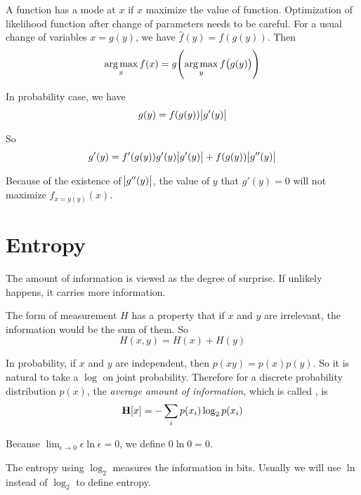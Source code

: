 \begin{theorem}
    A function has a mode at $x$ if $x$ maximize the value of function. Optimization of likelihood function after change of parameters needs to be careful. For a usual change of variables $x = g(y)$, we have $\hat{f}(y) = f(g(y))$. Then
    \begin{equation}
         \argmax{x}f(x) = g\mleft(\argmax{y}f\mleft(g(y)\mright)\mright)
    \end{equation}
    
    In probability case, we have
    \begin{equation}
        g(y) = f(g(y)) \abs{g'(y)}
    \end{equation}
    
    So
    \begin{equation}
        g'(y) = f'(g(y)) g'(y) \abs{g'(y)} + f(g(y)) \abs{g''(y)}
    \end{equation}
    
    Because of the existence of $\abs{g''(y)}$, the value of $y$ that $g'(y) = 0$ will not maximize $f_{x = g(y)}(x)$.
\end{theorem}


\section{Entropy}

\begin{definition}
    The amount of information is viewed as the degree of surprise. If unlikely happens, it carries more information. 
    
    The form of measurement $H$ has a property that if $x$ and $y$ are irrelevant, the information would be the sum of them. So
    \begin{equation}
        H(x,y) = H(x) + H(y)
    \end{equation}
    
    In probability, if $x$ and $y$ are independent, then $p(xy)= p(x) p(y)$. So it is natural to take a $\log$ on joint probability. Therefore for a discrete probability distribution $p(x)$, the \emph{average amount of information}, which is called , is
    \begin{equation}
        \entropy{x} = - \sum_i p(x_i) \log_2 p(x_i)
    \end{equation}
    
    Because $\displaystyle \lim_{\epsilon \rightarrow 0} \epsilon \ln \epsilon = 0$, we define $0 \ln 0 = 0$.
    
    The entropy using $\log_2$ measures the information in bits. Usually we will use $\ln$ instead of $\log_2$ to define entropy.
\end{definition}

